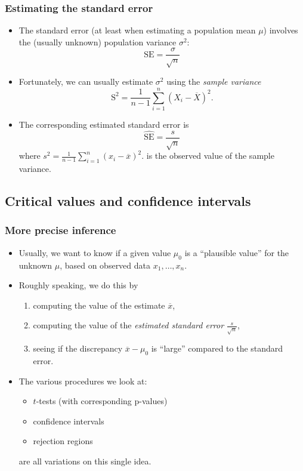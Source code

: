 \documentclass[a4paper]{article}
\begin{document}
\subsubsection{Estimating the standard error}
\begin{itemize}
	\item The standard error (at least when estimating a population mean \( \mu \)) involves the (usually unknown) population variance \( \sigma^2 \):
	\[
		\mathrm{SE} = \frac{\sigma}{\sqrt{n}}
	\]
	\item Fortunately, we can usually estimate \( \sigma^{2} \) using the \textit{sample variance}
	\[
		\mathrm{S}^{2} = \frac{1}{n-1} \sum_{i=1}^{n} (X_i - \overline{X})^2.
	\]
	\item The corresponding estimated standard error is
	\[
		\widehat{\mathrm{SE}} = \frac{s}{\sqrt{n}}
	\]
	where \( s^{2} = \frac{1}{n-1} \sum_{i=1}^{n} (x_i - \overline{x})^2. \)  is the observed value of the sample variance.
\end{itemize}
\subsection{Critical values and confidence intervals}
\subsubsection{More precise inference}
\begin{itemize}
	\item Usually, we want to know if a given value \( \mu_0 \) is a ``plausible value'' for the unknown \( \mu \), based on observed data \( x_1,\dotsc,x_n \).
	\item Roughly speaking, we do this by
	\begin{enumerate}
		\item computing the value of the estimate \( \overline{x} \),
		\item computing the value of the \textit{estimated standard error} \( \frac{s}{\sqrt{n}} \),
		\item seeing if the discrepancy \( \overline{x} - \mu_0 \) is ``large'' compared to the standard error.
	\end{enumerate}
	\item The various procedures we look at:
	\begin{itemize}
		\item \( t \)-tests (with corresponding p-values)
		\item confidence intervals
		\item rejection regions
	\end{itemize}
	are all variations on this single idea.
\end{itemize}
\end{document}
